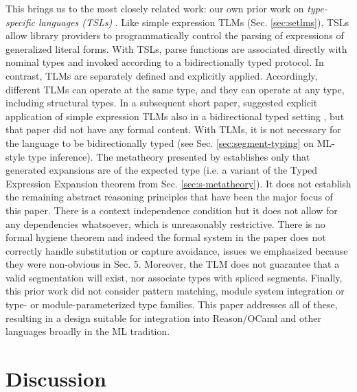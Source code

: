 \documentclass[acmsmall]{acmart}
\begin{document}
This brings us to the most closely related work: our own prior work on \emph{type-specific languages (TSLs)} \cite{TSLs}. Like simple expression TLMs (Sec. \ref{sec:setlms}), TSLs allow library providers to programmatically control the parsing of expressions of generalized literal forms. With TSLs, parse functions are associated directly with nominal types and invoked according to a bidirectionally typed protocol. In contrast, TLMs are separately defined and explicitly applied. Accordingly, different TLMs can operate at the same type, and they can operate at any type, including structural types.  In a subsequent short paper, \citet{sac15} suggested explicit application of simple expression TLMs  also in a bidirectional typed setting \cite{Pierce:2000:LTI:345099.345100}, but that paper did not have any formal content. With TLMs, it is not necessary for the language to be bidirectionally typed (see Sec. \ref{sec:segment-typing} on ML-style type inference). %
The metatheory presented by \citet{TSLs} establishes only that generated expansions are of the expected type (i.e. a variant of the Typed Expression Expansion theorem from Sec. \ref{sec:s-metatheory}). It does not establish the remaining abstract reasoning principles that have been the major focus of this paper. There is a context independence condition but it does not allow for any dependencies whatsoever, which is unreasonably restrictive. There is no formal hygiene theorem and indeed the formal system in the paper does not correctly handle substitution or capture avoidance, issues we emphasized because they were non-obvious in Sec. 5. Moreover, the TLM does not guarantee that a valid segmentation will exist, nor associate types with spliced segments. Finally, this prior work did not consider pattern matching, module system integration or type- or module-parameterized type families. This paper addresses all of these, resulting in a design suitable for integration into Reason/OCaml and other languages broadly in the ML tradition.


\section{Discussion}
\label{sec:discussion}
\label{sec:conclusion}
\end{document}
